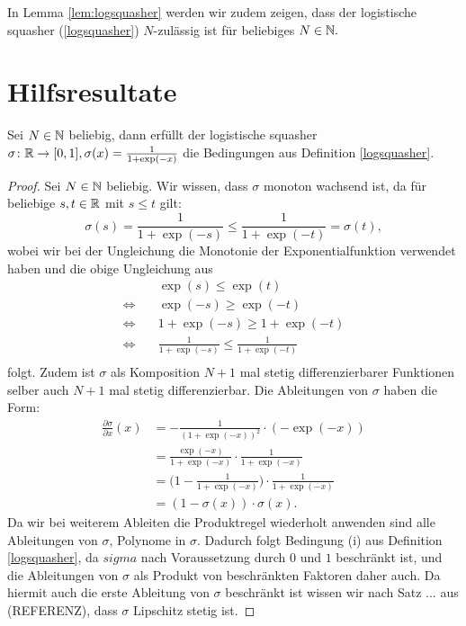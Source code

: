 In Lemma \ref{lem:logsquasher} werden wir zudem zeigen, dass der logistische squasher (\ref{logsquasher}) $N$-zulässig ist für beliebiges $N \in \mathbb{N}.$ 

\section{Hilfsresultate}
\begin{lem}
\label{lem:logsquasher}
Sei $N \in \mathbb{N}$ beliebig, dann erfüllt der logistische squasher $\sigma\colon \mathbb{R} \to [0, 1], \sigma(x) = \frac{1}{1 + \exp(-x)}$ die Bedingungen aus Definition \ref{logsquasher}.  
\end{lem}
\begin{proof}
Sei $N \in \mathbb{N}$ beliebig. Wir wissen, dass $\sigma$ monoton wachsend ist, da für beliebige $s, t \in \mathbb{R}$ mit $s \leq t$ gilt:
$$\sigma(s) = \frac{1}{1 + \exp(-s)} \leq \frac{1}{1 + \exp(-t)} = \sigma(t),$$
wobei wir bei der Ungleichung die Monotonie der Exponentialfunktion verwendet haben und die obige Ungleichung aus
\begin{equation*}
\begin{split}
& \quad \exp(s) \leq \exp(t) \\
 \Leftrightarrow & \quad \exp(-s) \geq \exp(-t) \\
 \Leftrightarrow & \quad 1 + \exp(-s) \geq 1 + \exp(-t) \\
 \Leftrightarrow & \quad \frac{1}{1 + \exp(-s)} \leq \frac{1}{1 + \exp(-t)} \\
\end{split}
\end{equation*}
folgt. Zudem ist $\sigma$ als Komposition $N + 1$ mal stetig differenzierbarer Funktionen selber auch $N + 1$ mal stetig differenzierbar. Die Ableitungen von $\sigma$ haben die Form$\colon$
\begin{equation*}
\begin{split}
\frac{\partial \sigma}{\partial x}(x) &= -\frac{1}{(1 + \exp(-x))^2} \cdot (-\exp(-x)) \\
& = \frac{\exp(-x)}{1 + \exp(-x)} \cdot \frac{1}{1 + \exp(-x)} \\
& = \bigg(1 - \frac{1}{1 + \exp(-x)}\bigg) \cdot \frac{1}{1 + \exp(-x)} \\
& = (1 - \sigma(x)) \cdot \sigma(x).
\end{split}
\end{equation*}
Da wir bei weiterem Ableiten die Produktregel wiederholt anwenden sind alle Ableitungen von $\sigma$, Polynome in $\sigma$. Dadurch folgt Bedingung (i) aus Definition \ref{logsquasher}, da $sigma$ nach Voraussetzung durch $0$ und $1$ beschränkt ist, und die Ableitungen von $\sigma$ als Produkt von beschränkten Faktoren daher auch. Da hiermit auch die erste Ableitung von $\sigma$ beschränkt ist wissen wir nach Satz ... aus (REFERENZ), dass $\sigma$ Lipschitz stetig ist.

\end{proof}
